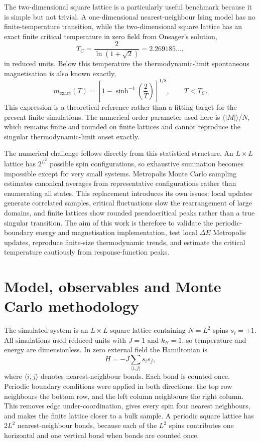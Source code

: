 \documentclass[twoside,twocolumn,9pt]{extarticle}
\begin{document}
The two-dimensional square lattice is a particularly useful benchmark because it is simple but not trivial. A one-dimensional nearest-neighbour Ising model has no finite-temperature transition, while the two-dimensional square lattice has an exact finite critical temperature in zero field from Onsager's solution,\cite{onsager1944}
\begin{equation}
  T_C = \frac{2}{\ln(1+\sqrt{2})}=2.269185\ldots ,
  \label{eq:exacttc}
\end{equation}
in reduced units. Below this temperature the thermodynamic-limit spontaneous magnetisation is also known exactly,\cite{yang1952}
\begin{equation}
  m_{\mathrm{exact}}(T)=\left[1-\sinh^{-4}\left(\frac{2}{T}\right)\right]^{1/8},\qquad T<T_C .
  \label{eq:yang}
\end{equation}
This expression is a theoretical reference rather than a fitting target for the present finite simulations. The numerical order parameter used here is \(\langle |M|\rangle/N\), which remains finite and rounded on finite lattices and cannot reproduce the singular thermodynamic-limit onset exactly.

The numerical challenge follows directly from this statistical structure. An \(L\times L\) lattice has \(2^{L^2}\) possible spin configurations, so exhaustive summation becomes impossible except for very small systems. Metropolis Monte Carlo sampling estimates canonical averages from representative configurations rather than enumerating all states. This replacement introduces its own issues: local updates generate correlated samples, critical fluctuations slow the rearrangement of large domains, and finite lattices show rounded pseudocritical peaks rather than a true singular transition. The aim of this work is therefore to validate the periodic-boundary energy and magnetisation implementation, test local \(\Delta E\) Metropolis updates, reproduce finite-size thermodynamic trends, and estimate the critical temperature cautiously from response-function peaks.

\section{Model, observables and Monte Carlo methodology}

The simulated system is an \(L\times L\) square lattice containing \(N=L^2\) spins \(s_i=\pm1\). All simulations used reduced units with \(J=1\) and \(k_B=1\), so temperature and energy are dimensionless. In zero external field the Hamiltonian is
\begin{equation}
  H = -J\sum_{\langle i,j\rangle}s_i s_j ,
  \label{eq:hamiltonian}
\end{equation}
where \(\langle i,j\rangle\) denotes nearest-neighbour bonds. Each bond is counted once. Periodic boundary conditions were applied in both directions: the top row neighbours the bottom row, and the left column neighbours the right column. This removes edge under-coordination, gives every spin four nearest neighbours, and makes the finite lattice closer to a bulk sample. A periodic square lattice has \(2L^2\) nearest-neighbour bonds, because each of the \(L^2\) spins contributes one horizontal and one vertical bond when bonds are counted once.
\end{document}
